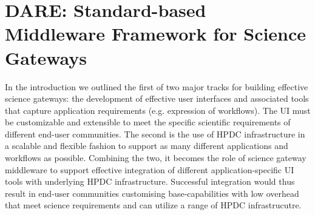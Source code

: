 \documentclass[]{svjour3}
\begin{document}







\section{DARE: Standard-based Middleware Framework for Science
  Gateways}


In the introduction we outlined the first of two major tracks for
building effective science gateways: the development of effective user
interfaces and associated tools that capture application requirements
(e.g. expression of workflows).  The UI must be customizable and
extensible to meet the specific scientific requirements of different
end-user communities.  The second is the use of HPDC infrastructure in
a scalable and flexible fashion to support as many different
applications and workflows as possible.  Combining the two, it becomes
the role of science gateway middleware to support effective
integration of different application-specific UI tools with underlying
HPDC infrastructure. Successful integration would thus result in
end-user communities customising base-capabilities with low overhead
that meet science requirements and can utilize a range of HPDC
infrastrucutre.
\end{document}
